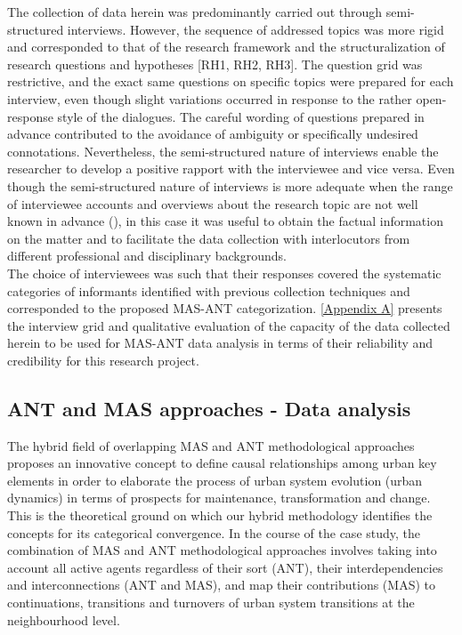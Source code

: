 \documentclass[11pt]{report}
\begin{document}
The collection of data herein was predominantly carried out through semi-structured interviews. However, the sequence of addressed topics was more rigid and corresponded to that of the research framework and the structuralization of research questions and hypotheses [RH1, RH2, RH3].
The question grid was restrictive, and the exact same questions on specific topics were prepared for each interview, even though slight variations occurred in response to the rather open-response style of the dialogues. The careful wording of questions prepared in advance contributed to the avoidance of ambiguity or specifically undesired connotations. Nevertheless, the semi-structured nature of interviews enable the researcher to develop a positive rapport with the interviewee and vice versa. Even though the semi-structured nature of interviews is more adequate when the range of interviewee accounts and overviews about the research topic are not well known in advance (\href{King}{\citealt{cassell_qualitative_1994}}), in this case it was useful to obtain the factual information on the matter and to facilitate the data collection with  interlocutors from different professional and disciplinary backgrounds. 
\\

The choice of interviewees was such that their responses covered the systematic categories of informants identified with previous collection techniques and corresponded to the proposed  MAS-ANT categorization. \href{Appendix A}{[Appendix A]} presents the interview grid and qualitative evaluation of the capacity of the data collected herein to be used for MAS-ANT data analysis in terms of their reliability and credibility for this research project.

\subsection{ANT and MAS approaches - Data analysis}

The hybrid field of overlapping MAS and ANT methodological approaches proposes an innovative concept to define causal relationships among urban key elements in order to elaborate the process of urban system evolution (urban dynamics) in terms of prospects for maintenance, transformation and change. This is the theoretical ground on which our hybrid methodology identifies the concepts for its categorical convergence. In the course of the case study, the combination of MAS and ANT methodological approaches involves taking into account all active agents regardless of their sort (ANT), their interdependencies and interconnections (ANT and MAS), and map their contributions (MAS) to continuations, transitions and turnovers of urban system transitions at the neighbourhood level.    
\end{document}
